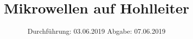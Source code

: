 

\subject{Versuch 53}
\title{Mikrowellen auf Hohlleiter}
\date{%
  Durchführung: 03.06.2019
  \hspace{3em}
  Abgabe: 07.06.2019
}



\maketitle
\thispagestyle{empty}
\tableofcontents
\newpage






\printbibliography{}


